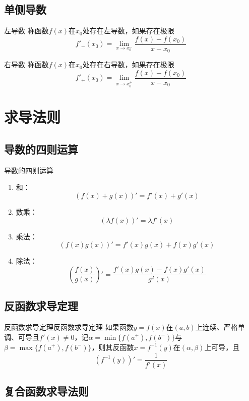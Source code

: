 \documentclass[lang = cn, scheme = chinese, thmcnt = section]{elegantbook}
\begin{document}
\subsection{单侧导数}

\begin{definition}{左导数}
	称函数$f(x)$在$x_0$处存在左导数，如果存在极限
	$$
	f'_{-}(x_0)=\lim_{x\to x_0^-}\frac{f(x)-f(x_0)}{x-x_0}
	$$
\end{definition}

\begin{definition}{右导数}
	称函数$f(x)$在$x_0$处存在右导数，如果存在极限
	$$
	f'_{+}(x_0)=\lim_{x\to x_0^+}\frac{f(x)-f(x_0)}{x-x_0}
	$$
\end{definition}

\section{求导法则}

\subsection{导数的四则运算}

\begin{proposition}{导数的四则运算}
	\begin{enumerate}
		\item 和：
		$$
		(f(x)+g(x))'=f'(x)+g'(x)
		$$
		\item 数乘：
		$$
		(\lambda f(x))'=\lambda f'(x)
		$$
		\item 乘法：
		$$
		(f(x)g(x))'=f'(x)g(x)+f(x)g'(x)
		$$
		\item 除法：
		$$
		\left(\frac{f(x)}{g(x)}\right)'
		=\frac{f'(x)g(x)-f(x)g'(x)}{g^2(x)}
		$$
	\end{enumerate}
\end{proposition}

\subsection{反函数求导定理}

\begin{theorem}{反函数求导定理}{反函数求导定理}
	如果函数$y=f(x)$在$(a,b)$上连续、严格单调、可导且$f'(x)\ne 0$，记$\alpha=\min\{ f(a^+),f(b^-) \}$与$\beta=\max\{ f(a^+),f(b^-) \}$，则其反函数$x=f^{-1}(y)$在$(\alpha,\beta)$上可导，且
	$$
	(f^{-1}(y))'=\frac{1}{f'(x)}
	$$
\end{theorem}

\subsection{复合函数求导法则}
\end{document}
